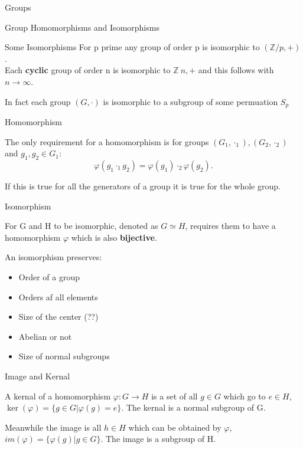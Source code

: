 \documentclass[12pt, letterpaper]{article}
\begin{document}
\begin{section}{Groups}
\begin{subsection}{Group Homomorphisms and Isomorphisms}
\begin{subsubsection}{Some Isomorphisms}
      For p prime any group of order p is isomorphic to \((\mathbb{Z} / p, +)\). \\
      Each \textbf{cyclic} group of order n is isomorphic to \(\mathbb{Z} \ n, +\)
      and this follows with \(n \to \infty\).

      In fact each group \((G, \cdot)\) is isomorphic to a subgroup of some
      permuation \(S_{p}\)

    \end{subsubsection}

    \begin{subsubsection}{Homomorphism}

      The only requirement for a homomorphism is for groups \((G_{1}, \cdot_{1}),
      (G_{2}, \cdot_{2})\) and \(g_{1}, g_{2} \in G_{1}\):
      \[\varphi(g_{1} \cdot_{1} g_{2}) = \varphi(g_{1}) \cdot_{2} \varphi(g_{2}).\]

      If this is true for all the generators of a group it is true for the whole
      group.

    \end{subsubsection}

    \begin{subsubsection}{Isomorphism}

      For G and H to be isomorphic, denoted as \(G \simeq H\), requires them
      to have a  homomorphism \(\varphi\) which is also \textbf{bijective}.

      An isomorphism preserves:
      \begin{itemize}
        \item Order of a group
        \item Orders af all elements
        \item Size of the center (??)
        \item Abelian or not
        \item Size of normal subgroups
      \end{itemize}

    \end{subsubsection}

    \begin{subsubsection}{Image and Kernal}

      A kernal of a homomorphism \(\varphi : G \to H\) is a set of all \(g \in G\)
      which go to \(e \in H\), \(\ker(\varphi) = \{ g \in G | \varphi(g) = e \}\).
      The kernal is a normal subgroup of G.

      Meanwhile the image is all \(h \in H\) which can be obtained by \(\varphi\),
      \(im(\varphi) = \{ \varphi(g) | g \in G \}\).
      The image is a subgroup of H.


\end{subsubsection}
\end{subsection}
\end{section}
\end{document}
